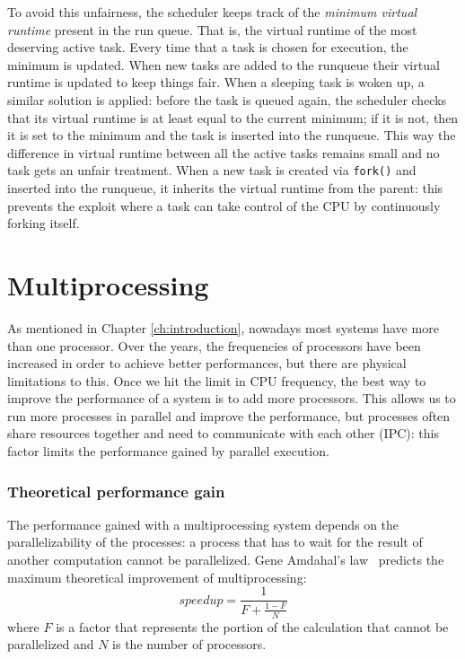 To avoid this unfairness, the scheduler keeps track of the \textit{minimum virtual runtime} present in the run queue. That is, the virtual runtime of the most deserving active task. Every time that a task is chosen for execution, the minimum is updated. When new tasks are added to the runqueue their virtual runtime is updated to keep things fair. When a sleeping task is woken up, a similar solution is applied: before the task is queued again, the scheduler checks that its virtual runtime is at least equal to the current minimum; if it is not, then it is set to the minimum and the task is inserted into the runqueue. This way the difference in virtual runtime between all the active tasks remains small and no task gets an unfair treatment. When a new task is created via \verb|fork()| and inserted into the runqueue, it inherits the virtual runtime from the parent: this prevents the exploit where a task can take control of the CPU by continuously forking itself.

\section{Multiprocessing}

As mentioned in Chapter \ref{ch:introduction}, nowadays most systems have more than one processor. Over the years, the frequencies of processors have been increased in order to achieve better performances, but there are physical limitations to this. Once we hit the limit in CPU frequency, the best way to improve the performance of a system is to add more processors. This allows us to run more processes in parallel and improve the performance, but processes often share resources together and need to communicate with each other (IPC): this factor limits the performance gained by parallel execution.

\subsubsection{Theoretical performance gain}
The performance gained with a multiprocessing system depends on the parallelizability of the processes: a process that has to wait for the result of another computation cannot be parallelized. Gene Amdahal's law~\cite{amdahl} predicts the maximum theoretical improvement of multiprocessing:
\begin{equation}
    speedup = \frac{1}{F + \frac{1-F}{N}}
\end{equation}
where $F$ is a factor that represents the portion of the calculation that cannot be parallelized and $N$ is the number of processors.

